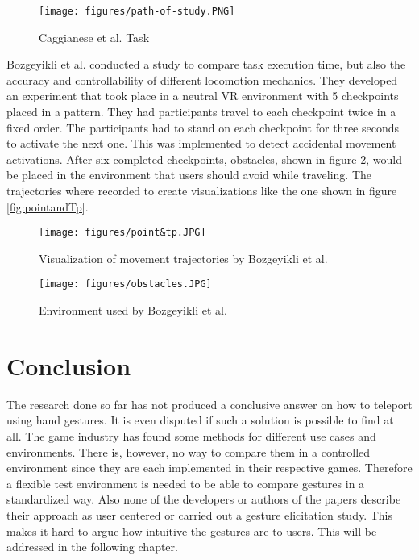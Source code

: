 \begin{figure}[hbt!]
  \centering
  \texttt{[image: figures/path-of-study.PNG]}
  \caption{Caggianese et al. \cite{Caggianese} Task}
  \label{fig:path}
\end{figure}

Bozgeyikli et al. \cite{bozgeyikli} conducted a study to compare task execution time, but also the accuracy and controllability of different locomotion mechanics. They developed an experiment that took place in a neutral VR environment with 5 checkpoints placed in a pattern. They had participants travel to each checkpoint twice in a fixed order. The participants had to stand on each checkpoint for three seconds to activate the next one. This was implemented to detect accidental movement activations. After six completed checkpoints, obstacles, shown in figure \ref{fig:obstacles}, would be placed in the environment that users should avoid while traveling. The trajectories where recorded to create visualizations like the one shown in figure \ref{fig:pointandTp}.

\begin{figure}[!htb]
      \texttt{[image: figures/point\&tp.JPG]}
      \caption{Visualization of movement trajectories by Bozgeyikli et al. \cite{bozgeyikli}}
      \label{fig:pointandTp}
  \endminipage\hfill
      \texttt{[image: figures/obstacles.JPG]}
      \caption{Environment used by Bozgeyikli et al. \cite{bozgeyikli}}
      \label{fig:obstacles}
  \endminipage\hfill
\end{figure}

\section{Conclusion}
The research done so far has not produced a conclusive answer on how to teleport using hand gestures. It is even disputed if such a solution is possible to find at all. The game industry has found some methods for different use cases and environments. There is, however, no way to compare them in a controlled environment since they are each implemented in their respective games. Therefore a flexible test environment is needed to be able to compare gestures in a standardized way. Also none of the developers or authors of the papers describe their approach as user centered or carried out a gesture elicitation study. This makes it hard to argue how intuitive the gestures are to users. This will be addressed in the following chapter. 
